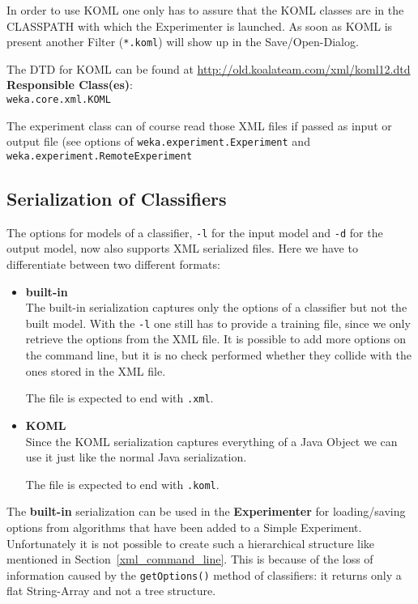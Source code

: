 \begin{itemize}
In order to use KOML one only has to assure that the KOML classes are
in the CLASSPATH with which the Experimenter is launched. As soon as
KOML is present another Filter (\verb=*.koml=) will show up in the
Save/Open-Dialog.

The DTD for KOML can be found at \url{http://old.koalateam.com/xml/koml12.dtd}{}\\

\noindent \textbf{Responsible Class(es)}:\\

\verb=weka.core.xml.KOML=\\
\end{itemize}

\noindent The experiment class can of course read those XML files if passed as
input or output file (see options of \verb=weka.experiment.Experiment= and
\verb=weka.experiment.RemoteExperiment=

\subsection{Serialization of Classifiers}
The options for models of a classifier, \verb=-l= for the input model and \verb=-d=
for the output model, now also supports XML serialized files. Here we
have to differentiate between two different formats:

\begin{itemize}
\item \textbf{built-in}\\
The built-in serialization captures only the options of a classifier
but not the built model. With the \verb=-l= one still has to provide a
training file, since we only retrieve the options from the XML
file. It is possible to add more options on the command line, but it
is no check performed whether they collide with the ones stored in the
XML file.

The file is expected to end with \verb=.xml=.

\item \textbf{KOML}\\
Since the KOML serialization captures everything of a Java Object we
can use it just like the normal Java serialization.

The file is expected to end with \verb=.koml=.
\end{itemize}

\noindent The \textbf{built-in} serialization can be used in the
\textbf{Experimenter} for loading/saving options from algorithms that
have been added to a Simple Experiment. Unfortunately it is not
possible to create such a hierarchical structure like mentioned in
Section~\ref{xml_command_line}. This is because of the loss of
information caused by the \verb=getOptions()= method of classifiers: it
returns only a flat String-Array and not a tree structure.\\

